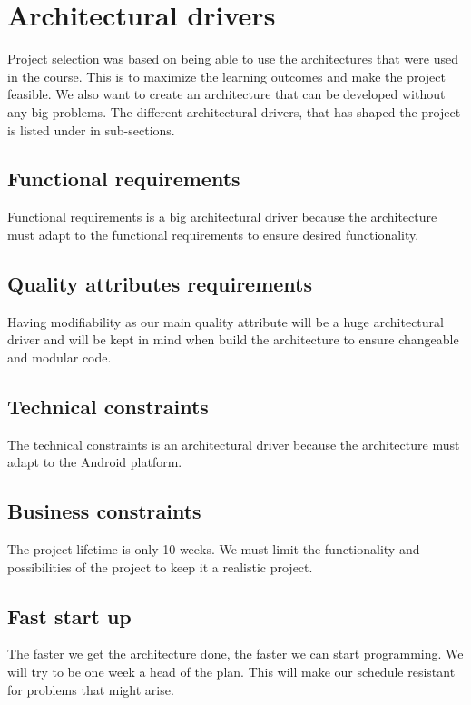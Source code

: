 \section{Architectural drivers}
Project selection was based on being able to use the architectures that were used in the course. This is to maximize the learning outcomes and make the project feasible. We also want to create an architecture that can be developed without any big problems. The different architectural drivers, that has shaped the project is listed under in sub-sections.

\subsection{Functional requirements}
Functional requirements is a big architectural driver because the architecture must adapt to the functional requirements to ensure desired functionality.
 
\subsection{Quality attributes requirements}
Having modifiability as our main quality attribute will be a huge architectural driver and will be kept in mind when build the architecture to ensure changeable and modular code.

\subsection{Technical constraints}
The technical constraints is an architectural driver because the architecture must adapt to the Android platform.

\subsection{Business constraints}
The project lifetime is only 10 weeks. We must limit the functionality and possibilities of the project to keep it a realistic project.

\subsection{Fast start up}
The faster we get the architecture done, the faster we can start programming. We will try to be one week a head of the plan. This will make our schedule resistant for problems that might arise.



